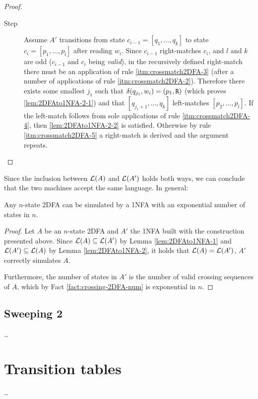 \begin{proof}
\begin{description}
		\item[Step] Assume $A'$ transitions from state $c_{i-1}=[q_1,\dots,q_k]$ to state $c_i=[p_1,\dots,p_l]$ after reading $w_i$.
		      Since $c_{i-1}$ right-matches $c_i$, and $l$ and $k$ are odd ($c_{i-1}$ and $c_i$ being \emph{valid}), in the recursively defined right-match there must be an application of rule \ref{itm:crossmatch2DFA-3} (after a number of applications of rule \ref{itm:crossmatch2DFA-2}).
		      Therefore there exists some smallest $j_1$ such that $\delta(q_{j_1},w_i)=(p_1,\mathtt R)$ (which proves \ref{lem:2DFAto1NFA-2-1}) and that $[q_{j_1+1},\dots,q_k]$ left-matches $[p_2,\dots,p_l]$.
		      If the left-match follows from sole applications of rule \ref{itm:crossmatch2DFA-4}, then \ref{lem:2DFAto1NFA-2-2} is satisfied.
		      Otherwise by rule \ref{itm:crossmatch2DFA-5} a right-match is derived and the argument repeats. \qedhere
	\end{description}
\end{proof}

Since the inclusion between $\mathcal L(A)$ and $\mathcal L(A')$ holds both ways, we can conclude that the two machines accept the same language.
In general:
\begin{thrm}\label{thm:2DFAto1NFA}
	Any $n$-state 2DFA can be simulated by a 1NFA with an exponential number of states in $n$.
\end{thrm}
\begin{proof}
	Let $A$ be an $n$-state 2DFA and $A'$ the 1NFA built with the construction presented above.
	Since $\mathcal L(A)\subseteq\mathcal L(A')$ by Lemma \ref{lem:2DFAto1NFA-1} and $\mathcal L(A')\subseteq\mathcal L(A)$ by Lemma \ref{lem:2DFAto1NFA-2}, it holds that $\mathcal L(A)=\mathcal L(A')$, \ie $A'$ correctly simulates $A$.

	Furthermore, the number of states in $A'$ is the number of valid crossing sequences of $A$, which by Fact \ref{fact:crossing-2DFA-num} is exponential in $n$.
\end{proof}



\subsection{Sweeping 2\DFAs{}}
\dots


\section{Transition tables}
\dots
